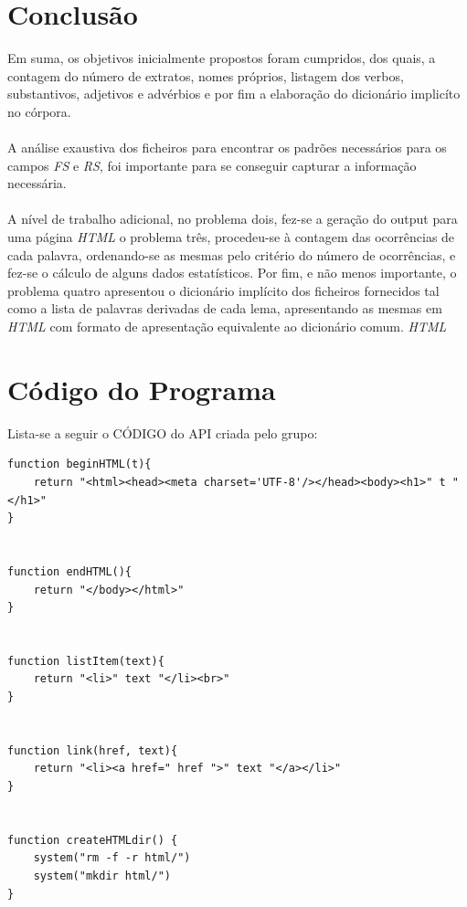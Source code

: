 \documentclass[11pt,a4paper]{report}%
\begin{document}
\chapter{Conclusão}
Em suma, os objetivos inicialmente propostos foram cumpridos, dos quais,  a contagem do número de extratos, nomes próprios, listagem dos verbos, substantivos, adjetivos e advérbios e por fim a elaboração do dicionário implicíto no córpora.
\\\\A análise exaustiva dos ficheiros para encontrar os padrões necessários para os campos \emph{FS} e \emph{RS}, foi importante para se conseguir capturar a informação necessária.
\\\\ A nível de trabalho adicional, no problema dois, fez-se a geração do output para uma página \emph{HTML} o problema três, procedeu-se à contagem das ocorrências de cada palavra, ordenando-se as mesmas pelo critério do número de ocorrências, e fez-se o cálculo de alguns dados estatísticos. Por fim, e não menos importante, o problema quatro apresentou o dicionário implícito dos ficheiros fornecidos tal como a lista de palavras derivadas de cada lema, apresentando as mesmas em \emph{HTML} com formato de apresentação equivalente ao dicionário comum.
\emph{HTML}
\appendix %
\chapter{Código do Programa}

Lista-se a seguir o CÓDIGO do API criada pelo grupo:
\begin{verbatim}
function beginHTML(t){
	return "<html><head><meta charset='UTF-8'/></head><body><h1>" t "</h1>"
}


function endHTML(){
	return "</body></html>"
}


function listItem(text){
	return "<li>" text "</li><br>"
}


function link(href, text){
	return "<li><a href=" href ">" text "</a></li>"
}


function createHTMLdir() {
	system("rm -f -r html/")
	system("mkdir html/")
}
\end{verbatim}
\end{document}
